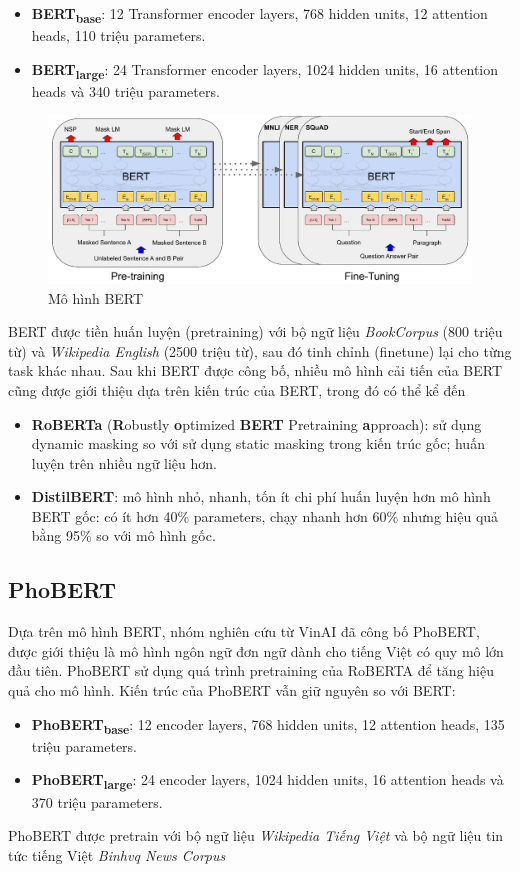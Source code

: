 \documentclass[12pt]{article}
\begin{document}
\begin{itemize}
\item \textbf{BERT\textsubscript{base}}: 12 Transformer encoder layers, 768 hidden units, 12 attention heads, 110 triệu parameters.
\item \textbf{BERT\textsubscript{large}}: 24 Transformer encoder layers, 1024 hidden units, 16 attention heads và 340 triệu parameters.
\end{itemize}
\begin{figure}
\centering
\includegraphics[scale=.65]{img/BERT.jpg}
\caption{Mô hình BERT\cite{devlin-etal-2019-bert}}
\label{fig:my_label}
\end{figure}
BERT được tiền huấn luyện (pretraining) với bộ ngữ liệu \textit{BookCorpus} (800 triệu từ) và \textit{Wikipedia English} (2500 triệu từ), sau đó tinh chỉnh (finetune) lại cho từng task khác nhau. Sau khi BERT được công bố, nhiều mô hình cải tiến của BERT cũng được giới thiệu dựa trên kiến trúc của BERT, trong đó có thể kể đến
\begin{itemize}
\item \textbf{RoBERTa} (\textbf{R}obustly \textbf{o}ptimized \textbf{BERT} Pretraining \textbf{a}pproach)\cite{DBLP:journals/corr/abs-1907-11692}: sử dụng dynamic masking so với sử dụng static masking trong kiến trúc gốc; huấn luyện trên nhiều ngữ liệu hơn.
\item \textbf{DistilBERT}\cite{DBLP:journals/corr/abs-1910-01108}: mô hình nhỏ, nhanh, tốn ít chi phí huấn luyện hơn mô hình BERT gốc: có ít hơn 40\% parameters, chạy nhanh hơn 60\% nhưng hiệu quả bằng 95\% so với mô hình gốc.
\end{itemize}

\subsection{PhoBERT}
Dựa trên mô hình BERT, nhóm nghiên cứu từ VinAI đã công bố PhoBERT\cite{phobert}, được giới thiệu là mô hình ngôn ngữ đơn ngữ dành cho tiếng Việt có quy mô lớn đầu tiên. PhoBERT sử dụng quá trình pretraining của RoBERTA để tăng hiệu quả cho mô hình. Kiến trúc của PhoBERT vẫn giữ nguyên so với BERT:
\begin{itemize}
\item \textbf{PhoBERT\textsubscript{base}}: 12 encoder layers, 768 hidden units, 12 attention heads, 135 triệu parameters.
\item \textbf{PhoBERT\textsubscript{large}}: 24 encoder layers, 1024 hidden units, 16 attention heads và 370 triệu parameters.
\end{itemize}
PhoBERT được pretrain với bộ ngữ liệu \textit{Wikipedia Tiếng Việt} và bộ ngữ liệu tin tức tiếng Việt \textit{Binhvq News Corpus}
\end{document}
